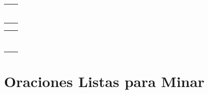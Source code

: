 \documentclass[12pt,a4paper]{article}
\begin{document}
\begin{cajachunk}
\begin{tabularx}{\textwidth}{@{} X l @{}}
\eng{I'd like to book a room.} & \esp{Quisiera reservar una habitación.} \\
\eng{I have a reservation under...} & \esp{Tengo una reserva a nombre de...} \\
\eng{What time is check-in / check-out?} & \esp{¿A qué hora es la entrada/salida?} \\
\eng{Where is the nearest pharmacy?} & \esp{¿Dónde queda la farmacia más cercana?} \\
\eng{I'd like a window seat, please.} & \esp{Quisiera un asiento de ventana.} \\
\eng{My flight has been delayed.} & \esp{Mi vuelo ha sido retrasado.} \\
\eng{Where can I exchange money?} & \esp{¿Dónde puedo cambiar dinero?} \\
\end{tabularx}
\end{cajachunk}

\begin{cajachunk}
\begin{tabularx}{\textwidth}{@{} X l @{}}
\eng{Help! / Please help me!} & \esp{¡Ayuda! / ¡Por favor, ayúdenme!} \\
\eng{Call an ambulance!} & \esp{¡Llamen una ambulancia!} \\
\eng{I need a doctor.} & \esp{Necesito un médico.} \\
\eng{I've lost my passport.} & \esp{He perdido mi pasaporte.} \\
\eng{My wallet was stolen.} & \esp{Me robaron la cartera.} \\
\eng{Where is the hospital?} & \esp{¿Dónde está el hospital?} \\
\eng{I'm allergic to ...} & \esp{Soy alérgico/a a ...} \\
\eng{It's an emergency.} & \esp{Es una emergencia.} \\
\end{tabularx}
\end{cajachunk}

\section{Oraciones Listas para Minar}
\end{document}

